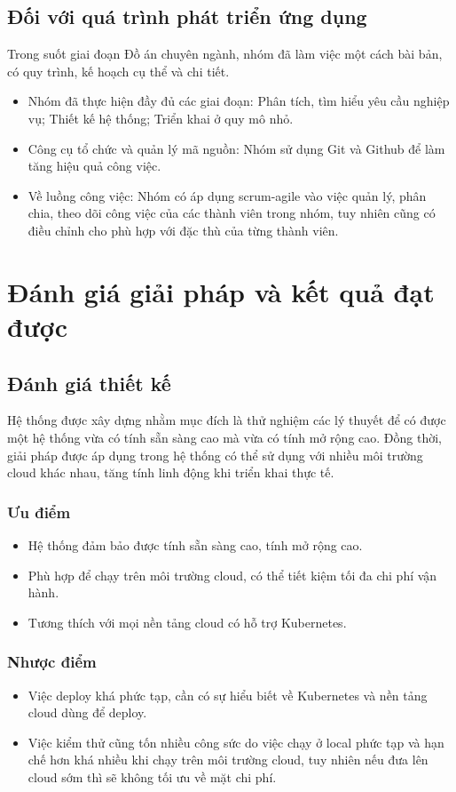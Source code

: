 \subsection{Đối với quá trình phát triển ứng dụng}
\noindent Trong suốt giai đoạn Đồ án chuyên ngành, nhóm đã làm việc một cách bài bản, có quy trình, kế hoạch cụ thể và chi tiết.
\begin{itemize}
    \item Nhóm đã thực hiện đầy đủ các giai đoạn: Phân tích, tìm hiểu yêu cầu nghiệp vụ; Thiết kế hệ thống; Triển khai ở quy mô nhỏ.
    \item Công cụ tổ chức và quản lý mã nguồn: Nhóm sử dụng Git và Github để làm tăng hiệu quả công việc.
    \item Về luồng công việc: Nhóm có áp dụng scrum-agile vào việc quản lý, phân chia, theo dõi công việc của các thành viên trong nhóm, tuy nhiên cũng có điều chỉnh cho phù hợp với đặc thù của từng thành viên.
\end{itemize}
\section{Đánh giá giải pháp và kết quả đạt được}
\subsection{Đánh giá thiết kế}
\noindent Hệ thống được xây dựng nhằm mục đích là thử nghiệm các lý thuyết để có được một hệ thống vừa có tính sẵn sàng cao mà vừa có tính mở rộng cao. Đồng thời, giải pháp được áp dụng trong hệ thống có thể sử dụng với nhiều môi trường cloud khác nhau, tăng tính linh động khi triển khai thực tế.
\subsubsection{Ưu điểm}
\begin{itemize}
    \item Hệ thống đảm bảo được tính sẵn sàng cao, tính mở rộng cao.
    \item Phù hợp để chạy trên môi trường cloud, có thể tiết kiệm tối đa chi phí vận hành.
    \item Tương thích với mọi nền tảng cloud có hỗ trợ Kubernetes.
\end{itemize}
\subsubsection{Nhược điểm}
\begin{itemize}
    \item Việc deploy khá phức tạp, cần có sự hiểu biết về Kubernetes và nền tảng cloud dùng để deploy.
    \item Việc kiểm thử cũng tốn nhiều công sức do việc chạy ở local phức tạp và hạn chế hơn khá nhiều khi chạy trên môi trường cloud, tuy nhiên nếu đưa lên cloud sớm thì sẽ không tối ưu về mặt chi phí.
\end{itemize}
